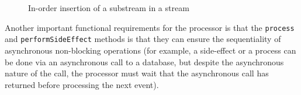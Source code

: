 \begin{figure}[h]
  \begin{center} 
    \caption{In-order insertion of a substream in a stream}
    \label{fig:substream}
  \end{center}
\end{figure}

Another important functional requirements for the processor is that the \verb|process| and \verb|performSideEffect| methods is that they can ensure the
sequentiality of asynchronous non-blocking operations (for example, a side-effect or a process can be done via an asynchronous call to a 
database, but despite the asynchronous nature of the call, the processor must wait that the asynchronous call has returned
before processing the next event).



